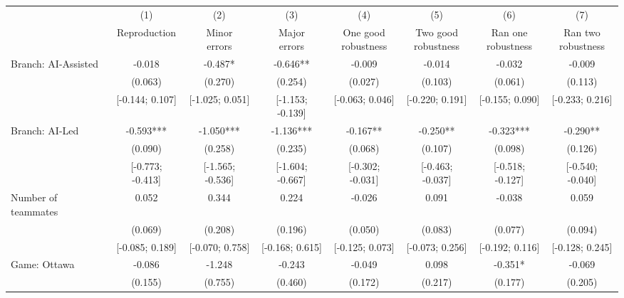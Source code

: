 \def\sym#1{\ifmmode^{#1}\else\(^{#1}\)\fi}
\begin{tabular}{l*{7}{c}}
\hline\hline
& (1) & (2) & (3) & (4) & (5) & (6) & (7)\\
                    &Reproduction   &\shortstack[c]{Minor\\errors}   &\shortstack[c]{Major\\errors}   &\shortstack[c]{One good\\robustness}   &\shortstack[c]{Two good\\robustness}   &\shortstack[c]{Ran one\\robustness}   &\shortstack[c]{Ran two\\robustness}   \\
\hline
Branch: AI-Assisted &      -0.018   &      -0.487*  &      -0.646** &      -0.009   &      -0.014   &      -0.032   &      -0.009   \\
                    &     (0.063)   &     (0.270)   &     (0.254)   &     (0.027)   &     (0.103)   &     (0.061)   &     (0.113)   \\
                    &[-0.144; 0.107]   &[-1.025; 0.051]   &[-1.153; -0.139]   &[-0.063; 0.046]   &[-0.220; 0.191]   &[-0.155; 0.090]   &[-0.233; 0.216]   \\
Branch: AI-Led      &      -0.593***&      -1.050***&      -1.136***&      -0.167** &      -0.250** &      -0.323***&      -0.290** \\
                    &     (0.090)   &     (0.258)   &     (0.235)   &     (0.068)   &     (0.107)   &     (0.098)   &     (0.126)   \\
                    &[-0.773; -0.413]   &[-1.565; -0.536]   &[-1.604; -0.667]   &[-0.302; -0.031]   &[-0.463; -0.037]   &[-0.518; -0.127]   &[-0.540; -0.040]   \\
Number of teammates &       0.052   &       0.344   &       0.224   &      -0.026   &       0.091   &      -0.038   &       0.059   \\
                    &     (0.069)   &     (0.208)   &     (0.196)   &     (0.050)   &     (0.083)   &     (0.077)   &     (0.094)   \\
                    &[-0.085; 0.189]   &[-0.070; 0.758]   &[-0.168; 0.615]   &[-0.125; 0.073]   &[-0.073; 0.256]   &[-0.192; 0.116]   &[-0.128; 0.245]   \\
Game: Ottawa        &      -0.086   &      -1.248   &      -0.243   &      -0.049   &       0.098   &      -0.351*  &      -0.069   \\
                    &     (0.155)   &     (0.755)   &     (0.460)   &     (0.172)   &     (0.217)   &     (0.177)   &     (0.205)   \\

\end{tabular}
